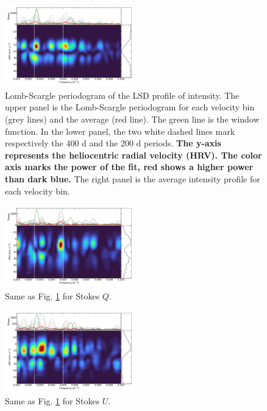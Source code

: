 \documentclass{aa}
\begin{document}
\begin{figure}[!h]
    \centering
    \includegraphics[width=0.5\textwidth]{Lomb-Scargle Intensity.pdf}
    \caption{Lomb-Scargle periodogram of the LSD profile of intensity.
    The upper panel is the Lomb-Scargle periodogram for each velocity bin (grey lines) and the average (red line). The green line is the window function.
    In the lower panel, the two white dashed lines mark respectively the 400 d and the 200 d periods. \textbf{The y-axis represents the heliocentric radial velocity (HRV). The color axis marks the power of the fit, red shows a higher power than dark blue.} The right panel is the average intensity profile for each velocity bin.}
    \label{LS intensity}
\end{figure}

\begin{figure}[!h]
    \centering
    \includegraphics[width=0.5\textwidth]{Lomb-Scargle Stokes Q.pdf}
    \caption{Same as Fig. \ref{LS intensity} for Stokes $Q$. }
    \label{LS Q}
\end{figure}

\begin{figure}[!h]
    \centering
    \includegraphics[width=0.5\textwidth]{Lomb-Scargle Stokes U.pdf}
    \caption{Same as Fig. \ref{LS intensity} for Stokes $U$.}
    \label{LS U}
\end{figure}
\end{document}
